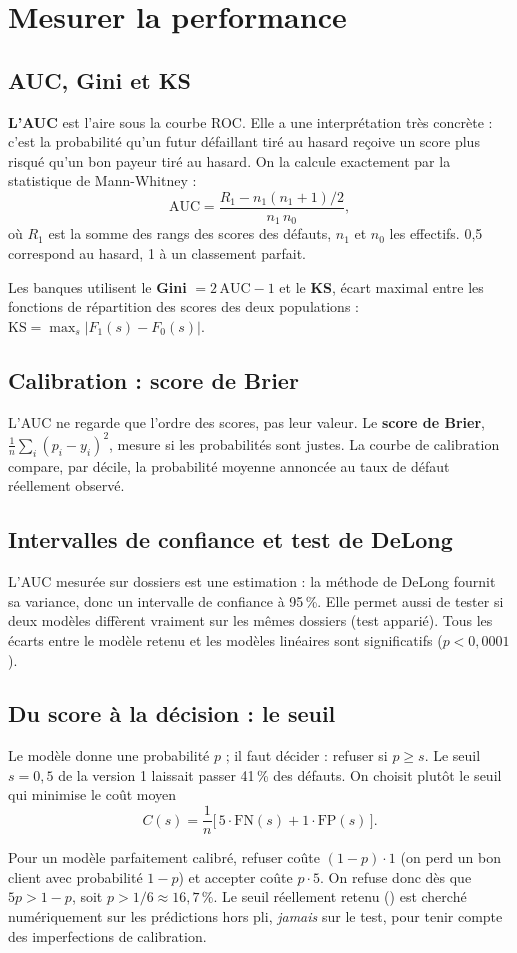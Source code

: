 \documentclass[11pt,a4paper]{article}
\begin{document}
\section{Mesurer la performance}

\subsection{AUC, Gini et KS}
\textbf{L'AUC} est l'aire sous la courbe ROC. Elle a une interprétation très concrète : c'est la probabilité qu'un futur défaillant tiré au hasard reçoive un score plus risqué qu'un bon payeur tiré au hasard. On la calcule exactement par la statistique de Mann-Whitney :
\[
\mathrm{AUC} = \frac{R_1 - n_1(n_1+1)/2}{n_1\,n_0},
\]
où $R_1$ est la somme des rangs des scores des défauts, $n_1$ et $n_0$ les effectifs. 0,5 correspond au hasard, 1 à un classement parfait.

Les banques utilisent le \textbf{Gini} $= 2\,\mathrm{AUC} - 1$ et le \textbf{KS}, écart maximal entre les fonctions de répartition des scores des deux populations : $\mathrm{KS} = \max_s |F_1(s) - F_0(s)|$.

\subsection{Calibration : score de Brier}
L'AUC ne regarde que l'ordre des scores, pas leur valeur. Le \textbf{score de Brier}, $\frac1n\sum_i (p_i - y_i)^2$, mesure si les probabilités sont justes. La courbe de calibration compare, par décile, la probabilité moyenne annoncée au taux de défaut réellement observé.

\subsection{Intervalles de confiance et test de DeLong}
L'AUC mesurée sur \nTest{} dossiers est une estimation : la méthode de DeLong fournit sa variance, donc un intervalle de confiance à 95\,\%. Elle permet aussi de tester si deux modèles diffèrent vraiment sur les mêmes dossiers (test apparié). Tous les écarts entre le modèle retenu et les modèles linéaires sont significatifs ($p < 0{,}0001$).

\subsection{Du score à la décision : le seuil}
\label{sec:seuil}
Le modèle donne une probabilité $p$ ; il faut décider : refuser si $p \geq s$. Le seuil $s = 0{,}5$ de la version 1 laissait passer 41\,\% des défauts. On choisit plutôt le seuil qui minimise le coût moyen
\[
C(s) = \frac{1}{n}\big[\,5 \cdot \mathrm{FN}(s) + 1 \cdot \mathrm{FP}(s)\,\big].
\]
\begin{intuition}
Pour un modèle parfaitement calibré, refuser coûte $(1-p)\cdot 1$ (on perd un bon client avec probabilité $1-p$) et accepter coûte $p \cdot 5$. On refuse donc dès que $5p > 1-p$, soit $p > 1/6 \approx 16{,}7\,\%$. Le seuil réellement retenu (\seuilXgb) est cherché numériquement sur les prédictions hors pli, \emph{jamais} sur le test, pour tenir compte des imperfections de calibration.
\end{intuition}
\end{document}
